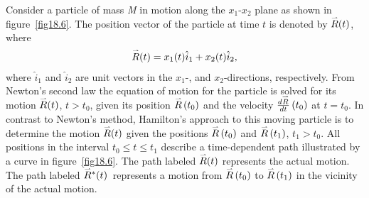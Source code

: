 \documentclass{AeroStructure-ERJohnson}
\def\harp#1{\smash{\mathord{\buildrel{\lower3pt\hbox{$\scriptscriptstyle\rightharpoonup$}}\over{#1}}}}
\begin{document}
Consider a particle of mass \textit{M} in motion along the $x_1$-$x_2$ plane as shown in figure~\ref{fig18.6}. The position vector of the particle at time $t$ is denoted by $\harp{R}(t)$, where
\begin{align}\label{eq18.56}
\harp{R}(t)=x_{1}(t) \hat{i}_{1}+x_{2}(t) \hat{i}_{2},
\end{align}
where $\hat{i}_{1}$ and $\hat{i}_{2}$ are unit vectors in the $x_{1}$-, and $x_2$-directions, respectively. From Newton's second law the equation of motion for the particle is solved for its motion $\harp{R}(t)$, $t>t_{0}$, given its position $\harp{R}\left(t_{0}\right)$ and the velocity $\frac{d \harp{R}}{d t}\left(t_{0}\right)$ at $t=t_{0}$. In contrast to Newton's method, Hamilton's approach to this moving particle is to determine the motion $\harp{R}(t)$ given the positions $\harp{R}\left(t_{0}\right)$ and $\harp{R}\left(t_{1}\right)$, $t_{1}>t_{0}$. All positions in the interval $t_{0} \leq t \leq t_{1}$ describe a time-dependent path illustrated by a curve in figure~\ref{fig18.6}. The path labeled $\harp{R}(t)$ represents the actual motion. The path labeled $\harp{R}^{*}(t)$~represents a motion from $\harp{R}\left(t_{0}\right)$ to $\harp{R}\left(t_{1}\right)$ in the vicinity of the actual motion.
\end{document}
